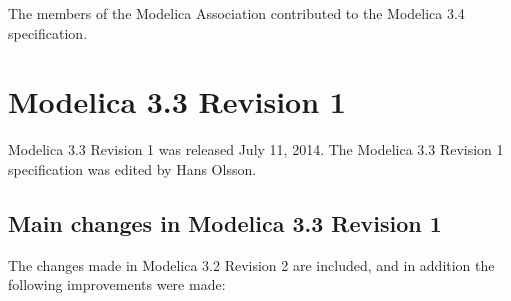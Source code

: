 \documentclass[10pt,a4paper]{report}
\def\doublelabel#1{\label{#1}\hypertarget{#1}{}}
\begin{document}
The members of the Modelica Association contributed to the Modelica 3.4
specification.

\section{Modelica 3.3 Revision 1}\doublelabel{modelica-3-3-revision-1}

Modelica 3.3 Revision 1 was released July 11, 2014. The Modelica 3.3
Revision 1 specification was edited by Hans Olsson.

\subsection{Main changes in Modelica 3.3 Revision 1}\doublelabel{main-changes-in-modelica-3-3-revision-1}
The changes made in Modelica 3.2 Revision 2 are included, and in
addition the following improvements were made:
\end{document}
